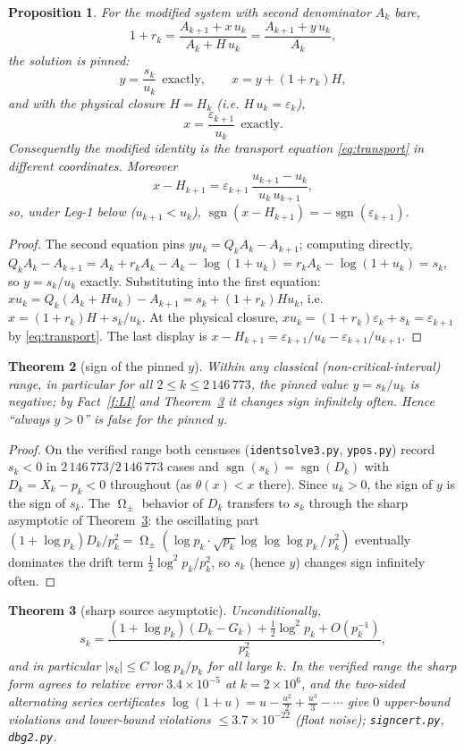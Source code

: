 \documentclass[11pt]{article}
\newtheorem{theorem}{Theorem}[section]
\newtheorem{proposition}[theorem]{Proposition}
\theoremstyle{remark}
\newcommand{\Xk}{X_k}
\newcommand{\Ak}{A_k}
\newcommand{\uk}{u_k}
\newcommand{\rk}{r_k}
\newcommand{\eps}{\varepsilon}
\DeclareMathOperator{\sgn}{sgn}
\DeclareMathOperator{\Om}{\Omega}
\begin{document}
\begin{proposition}\label{prop:pinned}
For the modified system with second denominator $\Ak$ bare,
\[
1+\rk=\frac{A_{k+1}+x\,\uk}{\Ak+H\,\uk}=\frac{A_{k+1}+y\,\uk}{\Ak},
\]
the solution is \emph{pinned}:
\[
y=\frac{s_k}{\uk}\ \ \text{exactly},\qquad
x=y+(1+\rk)H,
\]
and with the physical closure $H=H_k$ (i.e. $H\,\uk=\eps_k$),
\[
x=\frac{\eps_{k+1}}{\uk}\ \ \text{exactly}.
\]
Consequently the modified identity \emph{is} the transport equation
\eqref{eq:transport} in different coordinates. Moreover
\[
x-H_{k+1}=\eps_{k+1}\,\frac{u_{k+1}-\uk}{\uk\,u_{k+1}},
\]
so, under Leg-1 below ($u_{k+1}<\uk$), $\sgn(x-H_{k+1})=-\sgn(\eps_{k+1})$.
\end{proposition}

\begin{proof}
The second equation pins $y\uk=Q_k\Ak-A_{k+1}$; computing directly,
$Q_k\Ak-A_{k+1}=\Ak+\rk\Ak-\Ak-\log(1+\uk)=\rk\Ak-\log(1+\uk)=s_k$,
so $y=s_k/\uk$ exactly. Substituting into the first equation:
$x\uk=Q_k(\Ak+H\uk)-A_{k+1}=s_k+(1+\rk)H\uk$, i.e. $x=(1+\rk)H+s_k/\uk$.
At the physical closure, $x\uk=(1+\rk)\eps_k+s_k=\eps_{k+1}$ by
\eqref{eq:transport}. The last display is
$x-H_{k+1}=\eps_{k+1}/\uk-\eps_{k+1}/u_{k+1}$.
\end{proof}

\begin{theorem}[sign of the pinned $y$]\label{thm:yneg}
Within any classical (non-critical-interval) range, in particular for all
$2\le k\le 2\,146\,773$, the pinned value $y=s_k/\uk$ is negative; by
Fact~\ref{f:LI} and Theorem~\ref{thm:source} it changes sign infinitely often.
Hence ``always $y>0$'' is \emph{false} for the pinned $y$.
\end{theorem}

\begin{proof}
On the verified range both censuses (\texttt{identsolve3.py},
\texttt{ypos.py}) record $s_k<0$ in $2\,146\,773/2\,146\,773$ cases and
$\sgn(s_k)=\sgn(D_k)$ with $D_k=\Xk-p_k<0$ throughout (as $\theta(x)<x$
there). Since $\uk>0$, the sign of $y$ is the sign of $s_k$. The
$\Om_\pm$ behavior of $D_k$ transfers to $s_k$ through the sharp asymptotic of
Theorem~\ref{thm:source}: the oscillating part
$(1+\log p_k)D_k/p_k^2=\Om_\pm(\log p_k\cdot\sqrt{p_k}\log\log\log p_k\,/\,p_k^2)$
eventually dominates the drift term $\tfrac12\log^2p_k/p_k^2$, so $s_k$ (hence
$y$) changes sign infinitely often.
\end{proof}

\begin{theorem}[sharp source asymptotic]\label{thm:source}
Unconditionally,
\[
s_k=\frac{(1+\log p_k)(D_k-G_k)+\tfrac12\log^2p_k+O(p_k^{-1})}{p_k^2},
\]
and in particular $|s_k|\le C\,\log p_k/p_k$ for all large $k$. In the verified
range the sharp form agrees to relative error $3.4\times10^{-5}$ at
$k=2\times10^6$, and the two-sided alternating series certificates
$\log(1+u)=u-\tfrac{u^2}2+\tfrac{u^3}3-\cdots$ give $0$ upper-bound violations
and lower-bound violations $\le 3.7\times10^{-22}$ (float noise);
\texttt{signcert.py}, \texttt{dbg2.py}.
\end{theorem}
\end{document}
